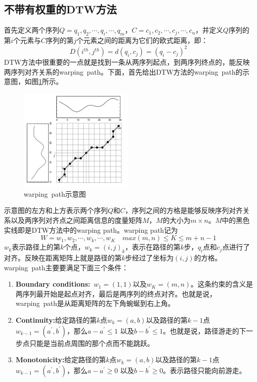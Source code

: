\subsection{不带有权重的DTW方法}
首先定义两个序列$Q=q_1,q_2,\cdots,q_i,\cdots,q_m$，$C=c_1,c_2,\cdots,c_j,\cdots,c_n$，并定义$Q$序列的第$i$个元素与$C$序列的第$j$个元素之间的距离为它们的欧式距离，即：
\begin{equation}\label{equ:2}
  D\left( {{i^{th}},{j^{th}}} \right) = d\left( {{q_i},{c_j}} \right) = {\left( {{q_i} - {c_j}} \right)^2}
\end{equation}
DTW方法中很重要的一点就是找到一条从两序列起点，到两序列终点的，能反映两序列对齐关系的warping\ path。下面，首先给出DTW方法的warping\ path的示意图，如图\ref{fig:5}所示。
\begin{figure}[h]
  \centering
  \includegraphics[width=0.5\textwidth]{./figure/three_way_plot.png}
  \caption{warping\ path示意图}\label{fig:5}
\end{figure}
示意图的左方和上方表示两个序列$Q$和$C$，序列之间的方格是能够反映序列对齐关系以及两序列对齐点之间距离信息的度量矩阵$M$，$M$的大小为$m \times n$。$M$中的黑色实线即是DTW方法中的warping path。warping path记为
\begin{equation}\label{equ:3}
  W = w_1,w_2,\cdots,w_k,\cdots,w_K \quad max(m,n) \leq K \leq m+n-1
\end{equation}
$w_k$表示路径上的第$k$个点，$w_k={(i,j)}_k$，表示在路径的第$k$步，$q_i$点和$c_j$点进行了对齐。反映在距离矩阵上就是路径的第$k$步经过了坐标为$(i,j)$的方格。
warping\ path主要要满足下面三个条件：
\begin{enumerate}
  \item \textbf{Boundary conditions:}\ $w_1=(1,1)$以及$w_K=(m,n)$。这条约束的含义是两序列最开始是起点对齐，最后是两序列的终点对齐。也就是说，warping\ path是从距离矩阵的左下角蜿蜒到右上角。
  \item \textbf{Continuity:}给定路径的第$k$点$w_k=(a,b)$以及路径的第$k-1$点$w_{k-1}=(a^{'},b^{'})$，那么$a-a^{'} \leq 1$ 以及$b-b^{'} \leq 1$。也就是说，路径游走的下一步点只能是当前点周围的那个点而不能跳跃。
  \item \textbf{Monotonicity:}给定路径的第$k$点$w_k=(a,b)$以及路径的第$k-1$点$w_{k-1}=(a^{'},b^{'})$，那么$a-a^{'} \geq 0$ 以及$b-b^{'} \geq 0$。表示路径只能向前游走。
\end{enumerate}

